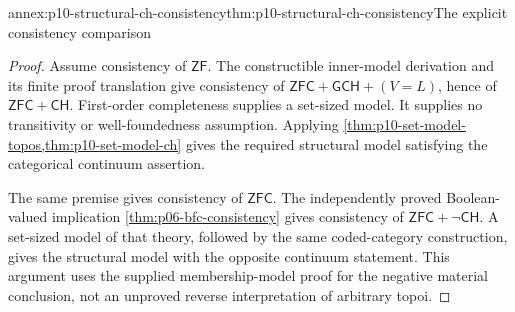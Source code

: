 \begin{annexitem}{annex:p10-structural-ch-consistency}{thm:p10-structural-ch-consistency}{The explicit consistency comparison}
\begin{proof}
Assume consistency of \(\mathsf{ZF}\).
The constructible inner-model derivation and its finite
proof translation give consistency of
\(\mathsf{ZFC}+\mathsf{GCH}+(V=L)\), hence of
\(\mathsf{ZFC}+\mathsf{CH}\).
First-order completeness supplies a set-sized model.
It supplies no transitivity or well-foundedness assumption.
Applying \cref{thm:p10-set-model-topos,thm:p10-set-model-ch}
gives the required structural model satisfying the
categorical continuum assertion.

The same premise gives consistency of \(\mathsf{ZFC}\).
The independently proved Boolean-valued implication
\cref{thm:p06-bfc-consistency} gives consistency of
\(\mathsf{ZFC}+\neg\mathsf{CH}\).
A set-sized model of that theory, followed by the same
coded-category construction, gives the structural model
with the opposite continuum statement.
This argument uses the supplied membership-model proof
for the negative material conclusion, not an unproved
reverse interpretation of arbitrary topoi.
\end{proof}
\end{annexitem}
